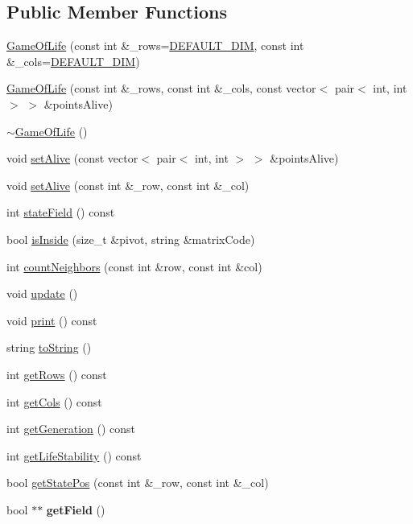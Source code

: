 \subsection*{Public Member Functions}
\begin{DoxyCompactItemize}
\item 
\hyperlink{classGameOfLife_a1fae1dfb9d89a62909d989397f2442f6}{Game\+Of\+Life} (const int \&\+\_\+rows=\hyperlink{classGameOfLife_a15976a2df224994b6fa2ca57242fd093}{D\+E\+F\+A\+U\+L\+T\+\_\+\+D\+IM}, const int \&\+\_\+cols=\hyperlink{classGameOfLife_a15976a2df224994b6fa2ca57242fd093}{D\+E\+F\+A\+U\+L\+T\+\_\+\+D\+IM})
\item 
\hyperlink{classGameOfLife_adfc1f458a6ab273c6d1de76265dfd86d}{Game\+Of\+Life} (const int \&\+\_\+rows, const int \&\+\_\+cols, const vector$<$ pair$<$ int, int $>$ $>$ \&points\+Alive)
\item 
\hyperlink{classGameOfLife_ab06a33fee5a200e5ef62e306aaaea9c7}{$\sim$\+Game\+Of\+Life} ()
\item 
void \hyperlink{classGameOfLife_ae892f218cd9b346884d625cf5a411b32}{set\+Alive} (const vector$<$ pair$<$ int, int $>$ $>$ \&points\+Alive)
\item 
void \hyperlink{classGameOfLife_a378dac8ab3735cddf8ece3e08eef88c7}{set\+Alive} (const int \&\+\_\+row, const int \&\+\_\+col)
\item 
int \hyperlink{classGameOfLife_a509bc5ca5942b09b76d3140af10e618a}{state\+Field} () const 
\item 
bool \hyperlink{classGameOfLife_ae00b9ea2168515d8e397dcb0c46f1560}{is\+Inside} (size\+\_\+t \&pivot, string \&matrix\+Code)
\item 
int \hyperlink{classGameOfLife_a1801dc503a5106b0ec5d5336057973d6}{count\+Neighbors} (const int \&row, const int \&col)
\item 
void \hyperlink{classGameOfLife_a14f03b541c2d1a8a5f9aaa7a1e63f514}{update} ()
\item 
void \hyperlink{classGameOfLife_a1bfc6cf715659f9a9ddb737d4d87be34}{print} () const 
\item 
string \hyperlink{classGameOfLife_a962e24b89ab41c9d214102904e1bf298}{to\+String} ()
\item 
int \hyperlink{classGameOfLife_a7d069e77011b08f8ffe1075eae6d72e6}{get\+Rows} () const 
\item 
int \hyperlink{classGameOfLife_a9393672eff631609e73b8a0b5b6817d2}{get\+Cols} () const 
\item 
int \hyperlink{classGameOfLife_a327b46e378f8d678dbc1492a12058c54}{get\+Generation} () const 
\item 
int \hyperlink{classGameOfLife_a3538ce375cb68fc0f90f4c86ad52be2e}{get\+Life\+Stability} () const 
\item 
bool \hyperlink{classGameOfLife_aeda28cd2f10ad35e4284b3c48b0e5072}{get\+State\+Pos} (const int \&\+\_\+row, const int \&\+\_\+col)
\item 
bool $\ast$$\ast$ {\bfseries get\+Field} ()\hypertarget{classGameOfLife_af73aadcce781aa58ce28eb23c64f6597}{}\label{classGameOfLife_af73aadcce781aa58ce28eb23c64f6597}

\end{DoxyCompactItemize}
